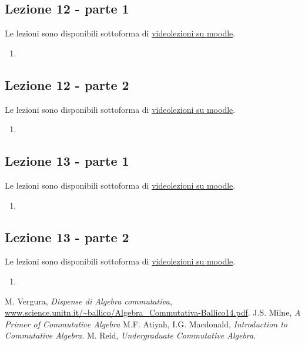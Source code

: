 \documentclass[italian]{article}
\begin{document}
    \subsection{Lezione 12 - parte 1}

	Le lezioni sono disponibili sottoforma di 
	\href{https://didatticaonline.unitn.it/dol/course/view.php?id=23268}{videolezioni
		su moodle}.
	
	\begin{enumerate}
		\item 
	\end{enumerate}   

	\subsection{Lezione 12 - parte 2}
	
	Le lezioni sono disponibili sottoforma di 
	\href{https://didatticaonline.unitn.it/dol/course/view.php?id=23268}{videolezioni
		su moodle}.
	
	\begin{enumerate}
		\item 
	\end{enumerate}  

	\subsection{Lezione 13 - parte 1}
	
	Le lezioni sono disponibili sottoforma di 
	\href{https://didatticaonline.unitn.it/dol/course/view.php?id=23268}{videolezioni
		su moodle}.
	
	\begin{enumerate}
		\item 
	\end{enumerate}  

	\subsection{Lezione 13 - parte 2}
	
	Le lezioni sono disponibili sottoforma di 
	\href{https://didatticaonline.unitn.it/dol/course/view.php?id=23268}{videolezioni
		su moodle}.
	
	\begin{enumerate}
		\item 
	\end{enumerate}  

    \begin{thebibliography}{9}
       M. Vergura, \textit{Dispense di Algebra commutativa},
        \url{www.science.unitn.it/~ballico/Algebra_Commutativa-Ballico14.pdf}.
       J.S. Milne, \textit{A Primer of Commutative Algebra}
       M.F. Atiyah, I.G. Macdonald, \textit{Introduction to 
            Commutative Algebra}.
       M. Reid, \textit{Undergraduate Commutative Algebra}.
    \end{thebibliography}
\end{document}
